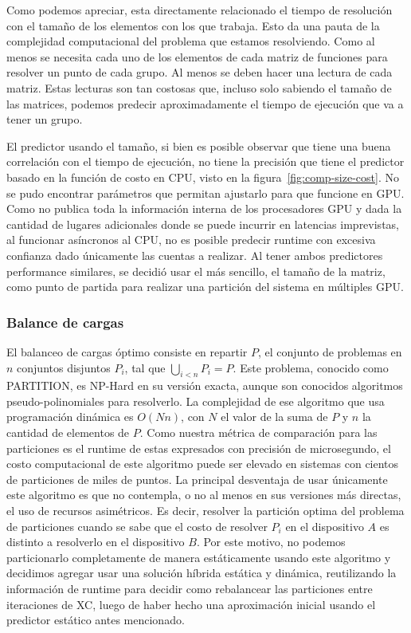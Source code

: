 Como podemos apreciar, esta directamente relacionado el tiempo de resoluci\'on con el tama\~no
de los elementos con los que trabaja. Esto da una pauta de la complejidad computacional del problema
que estamos resolviendo. Como al menos se necesita cada uno de los elementos de cada matriz de funciones
para resolver un punto de cada grupo. Al menos se deben hacer una lectura de cada matriz. Estas lecturas
son tan costosas que, incluso solo sabiendo el tama\~no de las matrices, podemos predecir aproximadamente
el tiempo de ejecuci\'on que va a tener un grupo.

El predictor usando el tama\~no, si bien es posible observar que tiene una buena correlaci\'on con el tiempo de ejecuci\'on,
no tiene la precisi\'on que tiene el predictor basado en la funci\'on de costo en CPU, visto en la figura~\ref{fig:comp-size-cost}.
No se pudo encontrar par\'ametros que permitan ajustarlo para que funcione en GPU. Como \nvidia no publica toda la informaci\'on
interna de los procesadores GPU y dada la cantidad de lugares adicionales donde se puede incurrir en latencias
imprevistas, al funcionar as\'incronos al CPU, no es posible predecir runtime con excesiva confianza dado \'unicamente
las cuentas a realizar. Al tener ambos predictores performance similares, se decidi\'o usar el m\'as sencillo, el
tama\~no de la matriz, como punto de partida para realizar una partici\'on del sistema en m\'ultiples GPU.

\subsubsection{Balance de cargas}
El balanceo de cargas \'optimo consiste en repartir $P$, el conjunto de problemas en
$n$ conjuntos disjuntos $P_i$, tal que $\bigcup_{i<n} P_i = P$. Este problema, conocido como PARTITION,
es NP-Hard en su versi\'on exacta, aunque son conocidos algoritmos pseudo-polinomiales para resolverlo.
La complejidad de ese algoritmo que usa programaci\'on din\'amica es $O(Nn)$, con $N$ el valor
de la suma de $P$ y $n$ la cantidad de elementos de $P$. Como nuestra m\'etrica de comparaci\'on para las
particiones es el runtime de estas expresados con precisi\'on de microsegundo, el costo computacional
de este algoritmo puede ser elevado en sistemas con cientos de particiones de miles de puntos.
La principal desventaja de usar \'unicamente este algoritmo es que no contempla, o no al menos
en sus versiones m\'as directas, el uso de recursos asim\'etricos. Es decir, resolver la partici\'on
optima del problema de particiones cuando se sabe que el costo de resolver $P_i$ en el dispositivo
$A$ es distinto a resolverlo en el dispositivo $B$. Por este motivo, no podemos particionarlo completamente
de manera est\'aticamente
usando este algoritmo y decidimos agregar usar una soluci\'on h\'ibrida est\'atica y din\'amica, reutilizando
la informaci\'on de runtime para decidir como rebalancear las particiones entre iteraciones de XC, luego
de haber hecho una aproximaci\'on inicial usando el predictor est\'atico antes mencionado.

